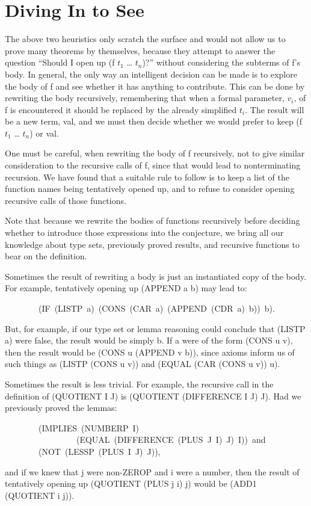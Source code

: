 \documentclass[10pt]{book}
\newenvironment{pubasis}{\begin{flushleft}}{\end{flushleft}}
\begin{document}
\section{Diving In to See}
The above two heuristics only scratch the surface and would not
allow us to prove many theorems by themselves,  because they
attempt to answer the question ``Should I open up (f $t_{1}$ \ldots{} $t_{n}$)?''
without considering the subterms of f's body.
In general, the only way an intelligent decision can be made is to
explore the body of f and see whether it has anything to
contribute.  This can be done by  rewriting the body recursively,
remembering that when a formal parameter, $v_{i}$, of f is encountered
it should be replaced by the already simplified $t_{i}$.
The result will be a new term, val, and we
must then  decide whether we would prefer to keep (f $t_{1}$ \ldots{} $t_{n}$)
or val.

One must be careful, when rewriting the body of f recursively,
not to give similar consideration to the recursive
calls of f, since that would lead to nonterminating recursion.
We have found that a suitable rule to
follow is to keep a list  of the function names
being tentatively opened up, and to refuse to consider
opening recursive calls of those functions.

Note that  because we rewrite the bodies of functions recursively before
deciding whether to introduce those expressions into the conjecture, we bring
all our knowledge about type sets, previously
proved results, and recursive functions to bear on the definition.

Sometimes the result of rewriting a body is just an
instantiated copy of the body.  For example, tentatively opening up
(APPEND a b)
may lead to:
\begin{pubasis}
~~~~~~~~(IF~(LISTP~a)~(CONS~(CAR~a)~(APPEND~(CDR~a)~b))~b).\\
\end{pubasis}
But, for example, if our type set or lemma reasoning could conclude that
(LISTP a) were false, the result would be simply b.  If a were of
the form (CONS u v), then the result would be (CONS u (APPEND v b)),
since axioms inform us of such things as (LISTP (CONS u v)) and
(EQUAL (CAR (CONS u v)) u).

Sometimes the result is less trivial.  For example, the
recursive call in the definition of (QUOTIENT I J) is (QUOTIENT (DIFFERENCE I J) J).  Had we previously proved the lemmas:
\begin{pubasis}
~~~~~~~~(IMPLIES~(NUMBERP~I)\\
~~~~~~~~~~~~~~~~~(EQUAL~(DIFFERENCE~(PLUS~J~I)~J)~I))~and\\

~~~~~~~~(NOT~(LESSP~(PLUS~I~J)~J)),\\
\end{pubasis}
and if we knew that j were non-ZEROP and i were a number,
then the result of tentatively opening up (QUOTIENT (PLUS j i) j)
would be (ADD1 (QUOTIENT i j)).
\end{document}
